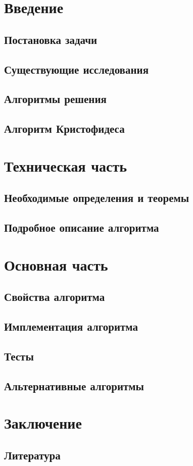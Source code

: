 \section{Введение}
\subsection{Постановка задачи}

\subsection{Существующие исследования}

\subsection{Алгоритмы решения}

\subsection{Алгоритм Кристофидеса}


\section{Техническая часть}
\subsection{Необходимые определения и теоремы}

\subsection{Подробное описание алгоритма}


\section{Основная часть}
\subsection{Свойства алгоритма}

\subsection{Имплементация алгоритма}

\subsection{Тесты}

\subsection{Альтернативные алгоритмы}


\section{Заключение}
\subsection{Литература}

